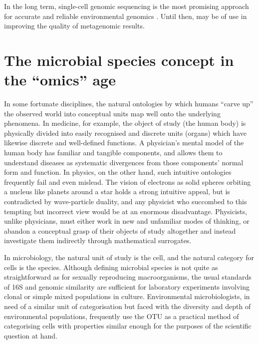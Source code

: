 In the long term, single-cell genomic sequencing is the most promising approach for accurate and reliable environmental genomics \cite{Blainey:2013dp}.
Until then,  may be of use in improving the quality of metagenomic results.

\section{The microbial species concept in the ``omics'' age}

In some fortunate disciplines, the natural ontologies by which humans ``carve up'' the observed world into conceptual units map well onto the underlying phenomena.
In medicine, for example, the object of study (the human body) is physically divided into easily recognised and discrete units (organs) which have likewise discrete and well-defined functions.
A physician's mental model of the human body has familiar and tangible components, and allows them to understand diseases as systematic divergences from those components' normal form and function.
In physics, on the other hand, such intuitive ontologies frequently fail and even mislead.
The vision of electrons as solid spheres orbiting a nucleus like planets around a star holds a strong intuitive appeal, but is contradicted by wave-particle duality, and any physicist who succombed to this tempting but incorrect view would be at an enormous disadvantage.
Physicists, unlike physicians, must either work in new and unfamiliar modes of thinking, or abandon a conceptual grasp of their objects of study altogether and instead investigate them indirectly through mathematical surrogates.

In microbiology, the natural unit of study is the cell, and the natural category for cells is the species.
Although defining microbial species is not quite as straightforward as for sexually reproducing macroorganisms, the usual standards of 16S and genomic similarity are sufficient for laboratory experiments involving clonal or simple mixed populations in culture.
Environmental microbiologists, in need of a similar unit of categorisation but faced with the diversity and depth of environmental populations, frequently use the \ac{OTU} as a practical method of categorising cells with properties similar enough for the purposes of the scientific question at hand.

